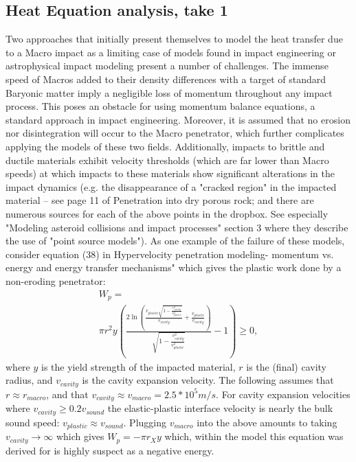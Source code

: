 \documentclass[prd,reprint,10pt]{revtex4-1}
\newcommand*\p[1]{\left(#1\right)}
\begin{document}
\subsection{Heat Equation analysis, take 1}
\par Two approaches that initially present themselves to model the heat transfer due to a Macro impact as a limiting case of models found in impact engineering or astrophysical impact modeling present a number of challenges.  The immense speed of Macros added to their density differences with a target of standard Baryonic matter imply a negligible loss of momentum throughout any impact process.  This poses an obstacle for using momentum balance equations, a standard approach in impact engineering.  Moreover, it is assumed that no erosion nor disintegration will occur to the Macro penetrator, which further complicates applying the models of these two fields.  Additionally, impacts to brittle and ductile materials exhibit velocity thresholds (which are far lower than Macro speeds) at which impacts to these materials show significant alterations in the impact dynamics (e.g. the disappearance of a "cracked region" in the impacted material -- see page 11 of Penetration into dry porous rock; and there are numerous sources for each of the above points in the dropbox.  See especially "Modeling asteroid collisions and impact processes" section 3 where they describe the use of "point source models").  As one example of the failure of these models, consider equation (38) in Hypervelocity penetration modeling- momentum vs. energy and energy transfer mechanisms" which gives the plastic work done by a non-eroding penetrator:
\begin{multline}
W_p = 
\\
\pi  r^2 y \p{\frac{2 \ln(\frac{v_{plastic}
   \sqrt{1-\frac{v_{cavity}^2}{v_{plastic}^2}}}{v_{cavity}}+\frac{{v_{plastic}}}{v_{cavity}})}{\sqrt{1-\frac{\
   v_{cavity}^2}{v_{plastic}^2}}}-1} \geq 0,
\end{multline}
where $y$ is the yield strength of the impacted material, $r$ is the (final) cavity radius, and $v_{cavity}$ is the cavity expansion velocity.  The following assumes that $r \approx r_{macro}$, 
and that $v_{cavity} \approx v_{macro} = 2.5*10^5 m/s$. 
For cavity expansion velocities where $v_{cavity} \geq 0.2v_{sound}$ the elastic-plastic interface velocity is nearly the bulk sound speed: $v_{plastic} \approx v_{sound}$. Plugging $v_{macro}$ into the above amounts to taking $v_{cavity}\to \infty$ which gives $W_p = -\pi r_X y $ which, within the model this equation was derived for is highly suspect as a negative energy.
\end{document}
